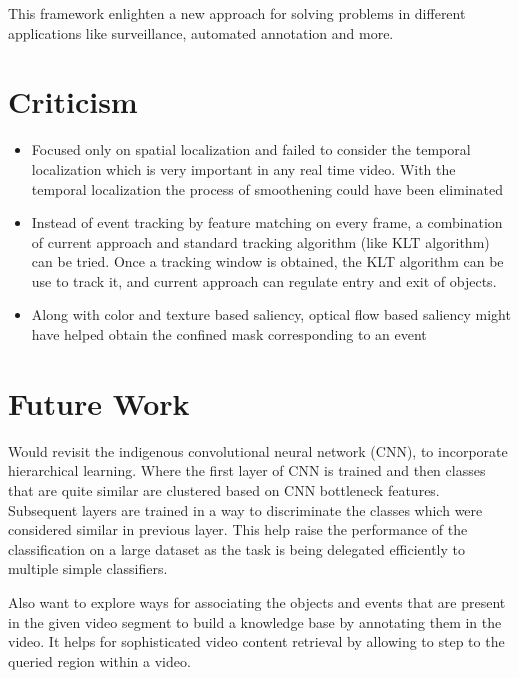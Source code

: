 \par This framework enlighten a new approach for solving problems in different applications like surveillance, automated annotation and more.

\section{Criticism}
\begin{itemize}
	\item{Focused only on spatial localization and failed to consider the temporal localization which is very important in any real time video. With the temporal localization the process of smoothening could have been eliminated}
	\item{Instead of event tracking by feature matching on every frame, a combination of current approach and standard tracking algorithm (like KLT algorithm) can be tried. Once a tracking window is obtained, the KLT algorithm can be use to track it, and current approach can regulate entry and exit of objects.}
	\item{Along with color and texture based saliency, optical flow based saliency might have helped obtain the confined mask corresponding to an event}
\end{itemize}
\clearpage 
\section{Future Work}
Would revisit the indigenous convolutional neural network (CNN), to incorporate hierarchical learning. Where the first layer of CNN is trained and then classes that are quite similar are clustered based on CNN bottleneck features. Subsequent layers are trained in a way to discriminate the classes which were considered similar in previous layer. This help raise the performance of the classification on a large dataset as the task is being delegated efficiently to multiple simple classifiers.
\par Also want to explore ways for associating the objects and events that are present in the given video segment to build a knowledge base by annotating them in the video. It helps for sophisticated video content retrieval by allowing to step to the queried region within a video.